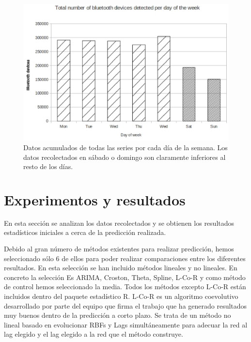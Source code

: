 \documentclass[runningheads]{llncs}
\begin{document}
\begin{figure}[htb]
 \begin{center}
\includegraphics[scale=0.6]{weekly.eps} 
 \caption{Datos acumulados de todas las series por cada día de la semana. Los datos recolectados
en sábado o domingo son claramente inferiores al resto de los días. 
 \label{fig:weekly}}
 \end{center}
 \end{figure}

\section{Experimentos y resultados}
\label{sec:experiments}

En esta sección se analizan los datos recolectados y se obtienen los resultados estadísticos
iniciales a cerca de la predicción realizada. 

Debido al gran número de métodos existentes para realizar predicción, hemos seleccionado sólo 6 de
ellos para poder realizar comparaciones entre los diferentes resultados. En esta selección se han
incluido métodos lineales y no lineales. En concreto la selección Es
ARIMA, Croston, Theta, %
Spline, L-Co-R y como método de control hemos seleccionado la media. Todos los métodos excepto
L-Co-R están incluidos dentro del paquete estadístico R. L-Co-R es un algoritmo coevolutivo
desarrollado por parte del equipo que firma el trabajo que ha generado resultados muy buenos dentro
de la predicción a corto plazo. Se trata de un método no lineal basado en evolucionar RBFs y Lags
simultáneamente para adecuar la red al lag elegido y el lag elegido a la red que el método
construye.
\end{document}
